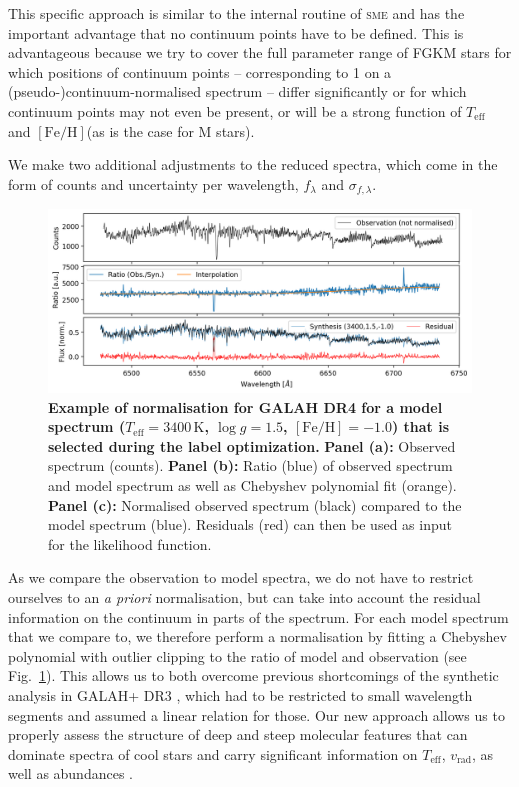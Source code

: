 \documentclass[
  journal=pasa,
  manuscript=research-paper, %
  year=2024,
  volume=37
]{cup-journal}
\newcommand{\Teff}{$T_\mathrm{eff}$\xspace}
\newcommand{\feh}{$\mathrm{[Fe/H]}$\xspace}
\newcommand{\vrad}{$v_\mathrm{rad}$\xspace}
\newcommand{\sme}{\textsc{sme}\xspace}
\begin{document}
This specific approach is similar to the internal routine of \sme \citep{Piskunov2017} and has the important advantage that no continuum points have to be defined. This is advantageous because we try to cover the full parameter range of FGKM stars for which positions of continuum points -- corresponding to 1 on a (pseudo-)continuum-normalised spectrum -- differ significantly or for which continuum points may not even be present, or will be a strong function of \Teff and \feh (as is the case for M stars).

We make two additional adjustments to the reduced spectra, which come in the form of counts and uncertainty per wavelength, $f_\lambda$ and $\sigma_{f,\lambda}$.

\begin{figure}[ht]
\centering
\includegraphics[width=\textwidth]{figures/Nuisance_example.png}
\caption{
\textbf{Example of normalisation for GALAH DR4 for a model spectrum ($T_\mathrm{eff} = 3400\,\mathrm{K}$, $\log g = 1.5$, $\mathrm{[Fe/H] = -1.0}$) that is selected during the label optimization.}
\textbf{Panel (a):} Observed spectrum (counts).
\textbf{Panel (b):} Ratio (blue) of observed spectrum and model spectrum as well as Chebyshev polynomial fit (orange).
\textbf{Panel (c):} Normalised observed spectrum (black) compared to the model spectrum (blue). Residuals (red) can then be used as input for the likelihood function.
}
\label{fig:ratio_normalisation}
\end{figure}

As we compare the observation to model spectra, we do not have to restrict ourselves to an \textit{a priori} normalisation, but can take into account the residual information on the continuum in parts of the spectrum. For each model spectrum that we compare to, we therefore perform a normalisation by fitting a Chebyshev polynomial with outlier clipping to the ratio of model and observation (see Fig.~\ref{fig:ratio_normalisation}). This allows us to both overcome previous shortcomings of the synthetic analysis in GALAH+ DR3 \citep{Buder2021}, which had to be restricted to small wavelength segments and assumed a linear relation for those. Our new approach allows us to properly assess the structure of deep and steep molecular features that can dominate spectra of cool stars and carry significant information on \Teff, \vrad, as well as abundances \citep{Mann2012}.
\end{document}
